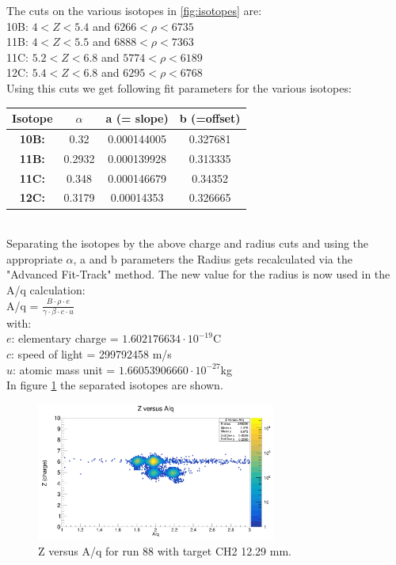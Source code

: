\documentclass[12pt, letterpaper]{article}
\begin{document}
The cuts on the various isotopes in \ref{fig:isotopes} are:\\
10B: $4 < Z < 5.4 $ and $6266 < \rho < 6735$\\
11B: $4 < Z < 5.5$ and $6888 < \rho < 7363$\\
11C: $5.2 < Z < 6.8$ and $5774 < \rho < 6189$\\
12C: $5.4 < Z < 6.8$ and $6295 < \rho < 6768$\\
\newline
Using this cuts we get following fit parameters for the various isotopes:\\
\newline
\begin{tabular}{|c|c|c|c|}
\hline
Isotope & $\alpha$ & a (= slope) & b (=offset) \\
\hline
\textbf{10B:} & 0.32 & 0.000144005 & 0.327681\\
\hline
\textbf{11B:} & 0.2932 & 0.000139928 & 0.313335\\
\hline
\textbf{11C:} & 0.348 & 0.000146679 & 0.34352\\
\hline
\textbf{12C:} & 0.3179 & 0.00014353 & 0.326665\\
\hline
\end{tabular}
\\
\newline
Separating the isotopes by the above charge and radius cuts and using the appropriate $\alpha$, a and b parameters the Radius gets recalculated via the "Advanced Fit-Track" method. The new value for the radius is now used in the A/q calculation:\\
A/q = $\frac{B \cdot \rho \cdot e}{\gamma\cdot\beta \cdot c \cdot u}$ \\
with:\\
$e$: elementary charge = $1.602176634\cdot10^{-19}$C\\
$c$: speed of light = 299792458 m/s\\
$u$: atomic mass unit = $1.66053906660\cdot10^{-27}$kg\\
In figure \ref{fig:z_vs_aq} the separated isotopes are shown.
\begin{figure}[!htb]
	\centering
	\includegraphics[width=0.7\textwidth]{z_vs_aq_combined.png}
	\caption{Z versus A/q for run 88 with target CH2 12.29 mm.}
	\label{fig:z_vs_aq}
\end{figure}
\end{document}
